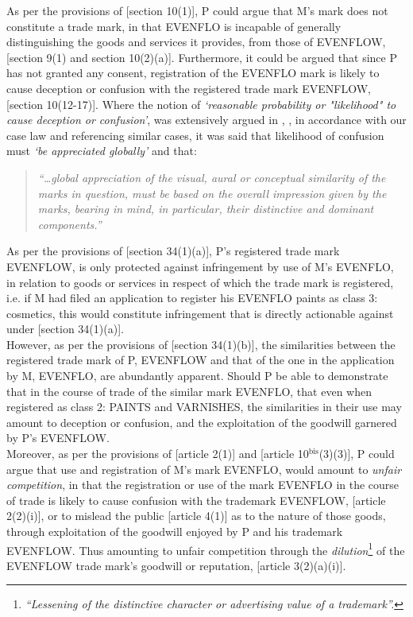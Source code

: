 \documentclass[11pt]{article}
\begin{document}
As per the provisions of [section 10(1)]\cite{rsa93_tm_act}, P could argue that
M's mark does not constitute a trade mark, in that EVENFLO is incapable of
generally distinguishing the goods and services it provides, from those of
EVENFLOW, [section 9(1) and section 10(2)(a)]\cite{rsa93_tm_act}. Furthermore, it
could be argued that since P has not granted any consent, registration of the
EVENFLO mark is likely to cause deception or confusion with the registered trade
mark EVENFLOW, [section 10(12-17)]\cite{rsa93_tm_act}. Where the notion of
\emph{`reasonable probability or "likelihood" to cause deception or confusion'}, was
extensively argued in ,
\cite{harms01_cowbell_v_ics}, in accordance with our case law and referencing
similar cases, it was said that likelihood of confusion must \emph{`be appreciated
globally'} and that:
\begin{quote}
\emph{``\ldots{}global appreciation of the visual, aural or conceptual similarity of the marks in question, must be based on the overall impression given by the marks, bearing in mind, in particular, their distinctive and dominant components.''}
\end{quote}


As per the provisions of [section 34(1)(a)]\cite{rsa93_tm_act}, P's registered trade mark EVENFLOW, is only protected against infringement by use of M's EVENFLO, in relation to goods or services in respect of which the trade mark is registered, i.e. if M had filed an application to register his EVENFLO paints as class 3: cosmetics, this would constitute infringement that is directly actionable against under [section 34(1)(a)]\cite{rsa93_tm_act}.\\

However, as per the provisions of [section 34(1)(b)]\cite{rsa93_tm_act}, the similarities between the registered trade mark of P, EVENFLOW and that of the one in the application by M, EVENFLO, are abundantly apparent. Should P be able to demonstrate that in the course of trade of the similar mark EVENFLO, that even when registered as class 2: PAINTS and VARNISHES, the similarities in their use may amount to deception or confusion, and the exploitation of the goodwill garnered by P's EVENFLOW.\\

Moreover, as per the provisions of [article 2(1)]\cite{wipo96_model_provi_unfair_comp} and [article 10\(^{\text{bis}}\)(3)(3)]\cite{wipo83_paris_conve_protect_ip}, P could argue that use and registration of M's mark EVENFLO, would amount to \emph{unfair competition}, in that the registration or use of the mark EVENFLO in the course of trade is likely to cause confusion with the trademark EVENFLOW, [article 2(2)(i)]\cite{wipo96_model_provi_unfair_comp}, or to mislead the public [article 4(1)]\cite{wipo96_model_provi_unfair_comp} as to the nature of those goods, through exploitation of the goodwill enjoyed by P and his trademark EVENFLOW. Thus amounting to unfair competition through the \emph{dilution}\footnote{\emph{``Lessening of the distinctive character or advertising value of a trademark''.}} of the EVENFLOW trade mark's goodwill or reputation, [article 3(2)(a)(i)]\cite{wipo96_model_provi_unfair_comp}.

\printbibliography
\end{document}

